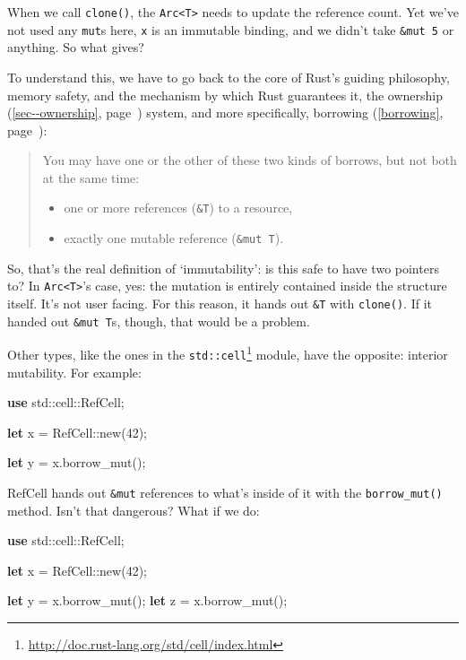 \documentclass[a4paper,]{book}
\renewcommand*{\hyperref}[2][\ar]{%
  \def\ar{#2}%
  #2 (\autoref{#1}, page~\pageref{#1})}
\newenvironment{Shaded}{\begin{snugshade}}{\end{snugshade}}
\newcommand{\KeywordTok}[1]{\textcolor[rgb]{0.13,0.29,0.53}{\textbf{{#1}}}}
\newcommand{\DecValTok}[1]{\textcolor[rgb]{0.00,0.00,0.81}{{#1}}}
\newcommand{\NormalTok}[1]{{#1}}
\renewcommand{\href}[2]{#2\footnote{\url{#1}}}
\providecommand{\tightlist}{%
  \setlength{\itemsep}{0pt}\setlength{\parskip}{0pt}}
\begin{document}
When we call \texttt{clone()}, the
\texttt{Arc\textless{}T\textgreater{}} needs to update the reference
count. Yet we've not used any \texttt{mut}s here, \texttt{x} is an
immutable binding, and we didn't take \texttt{\&mut\ 5} or anything. So
what gives?

To understand this, we have to go back to the core of Rust's guiding
philosophy, memory safety, and the mechanism by which Rust guarantees
it, the \hyperref[sec--ownership]{ownership} system, and more
specifically, \hyperref[borrowing]{borrowing}:

\begin{quote}
You may have one or the other of these two kinds of borrows, but not
both at the same time:

\begin{itemize}
\tightlist
\item
  one or more references (\texttt{\&T}) to a resource,
\item
  exactly one mutable reference (\texttt{\&mut\ T}).
\end{itemize}
\end{quote}

So, that's the real definition of `immutability': is this safe to have
two pointers to? In \texttt{Arc\textless{}T\textgreater{}}'s case, yes:
the mutation is entirely contained inside the structure itself. It's not
user facing. For this reason, it hands out \texttt{\&T} with
\texttt{clone()}. If it handed out \texttt{\&mut\ T}s, though, that
would be a problem.

Other types, like the ones in the
\href{http://doc.rust-lang.org/std/cell/index.html}{\texttt{std::cell}}
module, have the opposite: interior mutability. For example:

\begin{Shaded}
\begin{Highlighting}[]
\KeywordTok{use} \NormalTok{std::cell::RefCell;}

\KeywordTok{let} \NormalTok{x = RefCell::new(}\DecValTok{42}\NormalTok{);}

\KeywordTok{let} \NormalTok{y = x.borrow_mut();}
\end{Highlighting}
\end{Shaded}

RefCell hands out \texttt{\&mut} references to what's inside of it with
the \texttt{borrow\_mut()} method. Isn't that dangerous? What if we do:

\begin{Shaded}
\begin{Highlighting}[]
\KeywordTok{use} \NormalTok{std::cell::RefCell;}

\KeywordTok{let} \NormalTok{x = RefCell::new(}\DecValTok{42}\NormalTok{);}

\KeywordTok{let} \NormalTok{y = x.borrow_mut();}
\KeywordTok{let} \NormalTok{z = x.borrow_mut();}
\end{Highlighting}
\end{Shaded}
\end{document}

